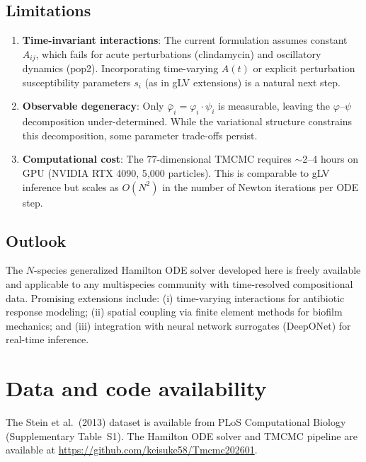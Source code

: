 \documentclass[10pt,a4paper]{article}
\begin{document}
\subsection{Limitations}

\begin{enumerate}
\item \textbf{Time-invariant interactions}: The current formulation
assumes constant $A_{ij}$, which fails for acute perturbations
(clindamycin) and oscillatory dynamics (pop2). Incorporating
time-varying $A(t)$ or explicit perturbation susceptibility parameters
$s_i$ (as in gLV extensions) is a natural next step.

\item \textbf{Observable degeneracy}: Only $\bar{\varphi}_i = \varphi_i
\cdot \psi_i$ is measurable, leaving the $\varphi$--$\psi$ decomposition
under-determined. While the variational structure constrains this
decomposition, some parameter trade-offs persist.

\item \textbf{Computational cost}: The 77-dimensional TMCMC requires
$\sim$2--4 hours on GPU (NVIDIA RTX 4090, 5{,}000 particles). This is
comparable to gLV inference but scales as $O(N^2)$ in the number of
Newton iterations per ODE step.
\end{enumerate}

\subsection{Outlook}

The $N$-species generalized Hamilton ODE solver developed here is freely
available and applicable to any multispecies community with time-resolved
compositional data. Promising extensions include: (i) time-varying
interactions for antibiotic response modeling; (ii) spatial coupling
via finite element methods for biofilm mechanics; and (iii) integration
with neural network surrogates (DeepONet) for real-time inference.

\section*{Data and code availability}

The Stein et al.\ (2013) dataset is available from PLoS Computational
Biology (Supplementary Table~S1). The Hamilton ODE solver and TMCMC
pipeline are available at \url{https://github.com/keisuke58/Tmcmc202601}.
\end{document}
